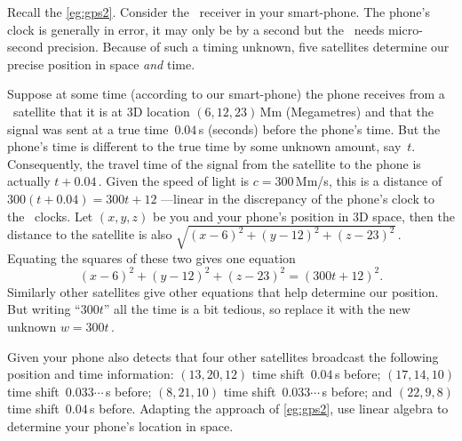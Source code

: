 \begin{example} \label{eg:gps3t}
Recall the \autoref{eg:gps2}.
Consider the \gps\ receiver in your smart-phone.
The phone's clock is generally in error, it may only be by a second but the \gps\ needs micro-second precision. 
Because of such a timing unknown, five satellites determine our precise position in space \emph{and} time.

Suppose at some time (according to our smart-phone) the phone receives from a \gps\ satellite that it is at 3D location \((6,12,23)\)\,Mm (Megametres) and that the signal was sent at a true time~\(0.04\)\,s (seconds) before the phone's time.
But the phone's time is different to the true time by some unknown amount, say~\(t\).
Consequently, the travel time of the signal from the satellite to the phone is actually \(t+0.04\)\,.
Given the speed of light is \(c=300\)\,Mm/s, this is a distance of \(300(t+0.04)=300t+12\) ---linear in the discrepancy of the phone's clock to the \gps\ clocks.
Let \((x,y,z)\) be you and your phone's position in 3D space, then the distance to the satellite is also \(\sqrt{(x-6)^2+(y-12)^2+(z-23)^2}\)\,.
Equating the squares of these two gives one equation
\begin{equation*}
(x-6)^2+(y-12)^2+(z-23)^2=(300t+12)^2.
\end{equation*}
Similarly other satellites give other equations that help determine our position.
But writing ``\(300t\)'' all the time is a bit tedious, so replace it with the new unknown \(w=300t\)\,.

Given your phone also detects that four other satellites broadcast the following position and time information:
\((13,20,12)\) time shift~\(0.04\)\,s before;
\((17,14,10)\) time shift~\(0.033\cdots\)\,s before;
\((8,21,10)\) time shift~\(0.033\cdots\)\,s before; and
\((22,9,8)\) time shift~\(0.04\)\,s before.
Adapting the approach of \autoref{eg:gps2}, use linear algebra to determine your phone's location in space.


\end{example}
